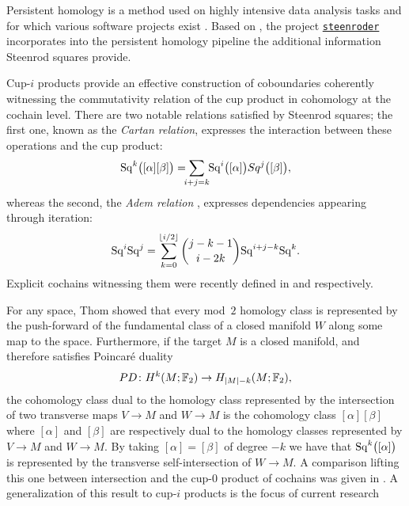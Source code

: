 \begin{remark*}
	Persistent homology is a method used on highly intensive data analysis tasks \cite{carlsson2008images, chan2013viral, lee2017quantifying} and for which various software projects exist \cite{bauer2021ripser, gudhi, medina2021giotto}.
	Based on \cite{medina2018persistence}, the project \href{https://github.com/Steenroder/steenroder}{\texttt{steenroder}} incorporates into the persistent homology pipeline the additional information Steenrod squares provide.
\end{remark*}

\begin{remark*}[Relations]
	Cup-$i$ products provide an effective construction of coboundaries coherently witnessing the commutativity relation of the cup product in cohomology at the cochain level.
	There are two notable relations satisfied by Steenrod squares;
	the first one, known as the \textit{Cartan relation}, expresses the interaction between these operations and the cup product:
	\begin{equation*}
	\Sq^k \big( [\alpha] [\beta] \big) =
	\sum_{\mathclap{i+j=k}} \, \Sq^i\big([\alpha]\big) Sq^j\big([\beta]\big),
	\end{equation*}
	whereas the second, the \textit{Adem relation} \cite{adem1952iteration}, expresses dependencies appearing through iteration:
	\begin{equation*}
	\mathrm{Sq}^i \mathrm{Sq}^j =
	\sum_{k=0}^{\lfloor i/2 \rfloor} \binom{j-k-1}{i-2k} \mathrm{Sq}^{i+j-k} \mathrm{Sq}^k.
	\end{equation*}
	Explicit cochains witnessing them were recently defined in \cite{medina2020cartan} and \cite{medina2021adem} respectively.
\end{remark*}

\begin{remark*}
	For any space, Thom showed that every mod~$2$ homology class is represented by the push-forward of the fundamental class of a closed manifold $W$ along some map to the space.
	Furthermore, if the target $M$ is a closed manifold, and therefore satisfies Poincar\'{e} duality
	\[
	PD \colon H^k(M ;{\mathbb{F}_2}) \to H_{\lvert M\rvert-k}(M; {\mathbb{F}_2}),
	\]
	the cohomology class dual to the homology class represented by the intersection of two transverse maps $V \to M$ and $W \to M$ is the cohomology class $[\alpha] [\beta]$ where $[\alpha]$ and $[\beta]$ are respectively dual to the homology classes represented by $V \to M$ and $W \to M$.
	By taking $[\alpha] = [\beta]$ of degree $-k$ we have that $\mathrm{Sq}^k \big( [\alpha] \big)$ is represented by the transverse self-intersection of $W \to M$.
	A comparison lifting this one between intersection and the cup-$0$ product of cochains was given in \cite{medina2021flowing}.
	A generalization of this result to \mbox{cup-$i$} products is the focus of current research \cite{medina2022foundations}
\end{remark*}